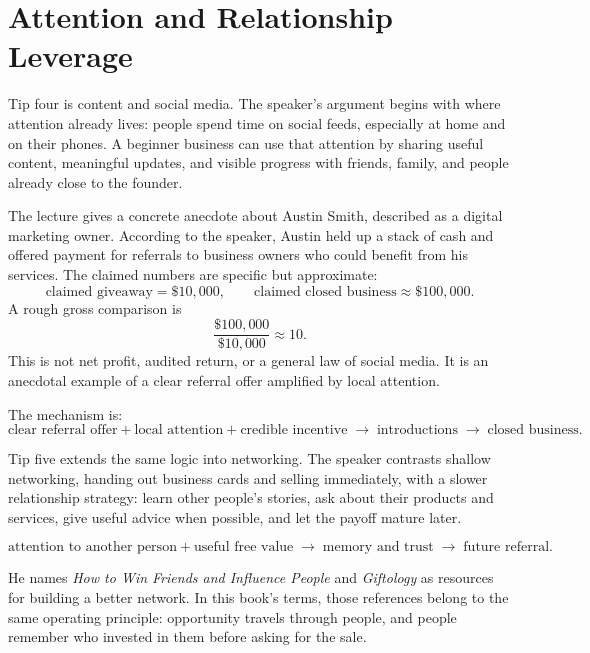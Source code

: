 \documentclass[11pt,oneside]{book}
\begin{document}
\section{Attention and Relationship Leverage}

Tip four is content and social media. The speaker's argument begins with where attention already lives: people spend time on social feeds, especially at home and on their phones. A beginner business can use that attention by sharing useful content, meaningful updates, and visible progress with friends, family, and people already close to the founder.

The lecture gives a concrete anecdote about Austin Smith, described as a digital marketing owner. According to the speaker, Austin held up a stack of cash and offered payment for referrals to business owners who could benefit from his services. The claimed numbers are specific but approximate:
\[
\text{claimed giveaway}=\$10{,}000,\qquad
\text{claimed closed business}\approx \$100{,}000.
\]
A rough gross comparison is
\[
\frac{\$100{,}000}{\$10{,}000}\approx 10.
\]
This is not net profit, audited return, or a general law of social media. It is an anecdotal example of a clear referral offer amplified by local attention.

The mechanism is:
\[
\text{clear referral offer}
+
\text{local attention}
+
\text{credible incentive}
\;\longrightarrow\;
\text{introductions}
\;\longrightarrow\;
\text{closed business}.
\]

Tip five extends the same logic into networking. The speaker contrasts shallow networking, handing out business cards and selling immediately, with a slower relationship strategy: learn other people's stories, ask about their products and services, give useful advice when possible, and let the payoff mature later.

\[
\text{attention to another person}
+
\text{useful free value}
\;\longrightarrow\;
\text{memory and trust}
\;\longrightarrow\;
\text{future referral}.
\]

He names \emph{How to Win Friends and Influence People} and \emph{Giftology} as resources for building a better network. In this book's terms, those references belong to the same operating principle: opportunity travels through people, and people remember who invested in them before asking for the sale.

\end{document}
